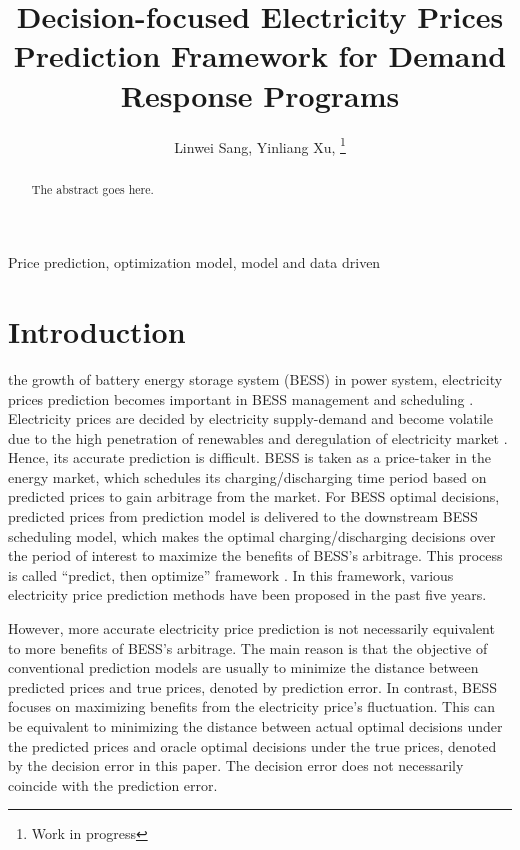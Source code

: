 \documentclass[journal]{IEEEtran}
\begin{document}
\title{Decision-focused Electricity Prices Prediction Framework for Demand Response Programs}

\author{Linwei Sang,
Yinliang Xu,
\thanks{Work in progress}
}

\maketitle

\begin{abstract}
The abstract goes here.
\end{abstract}

\begin{IEEEkeywords}
Price prediction, optimization model, model and data driven
\end{IEEEkeywords}


\IEEEpeerreviewmaketitle


\section{Introduction}

 the growth of battery energy storage system (BESS) in power system, electricity prices prediction becomes important in BESS management and scheduling \cite{Chitsaz2018}. Electricity prices are decided by electricity supply-demand and become volatile due to the high penetration of renewables and deregulation of electricity market \cite{Peng2018}. Hence, its accurate prediction is difficult. BESS is taken as a price-taker in the energy market, which schedules its charging/discharging time period based on predicted prices to gain arbitrage from the market\cite{Arteaga2019}. For BESS optimal decisions, predicted prices from prediction model is delivered to the downstream BESS scheduling model, which makes the optimal charging/discharging decisions over the period of interest to maximize the benefits of BESS's arbitrage. This process is called ``predict, then optimize'' framework \cite{Elmachtoub2020}. In this framework, various electricity price prediction methods have been proposed in the past five years. 

However, more accurate electricity price prediction is not necessarily equivalent to more benefits of BESS's arbitrage. The main reason is that the objective of conventional prediction models are usually to minimize the distance between predicted prices and true prices, denoted by prediction error. In contrast, BESS focuses on maximizing benefits from the electricity price's fluctuation. This can be equivalent to minimizing the distance between actual optimal decisions under the predicted prices and oracle optimal decisions under the true prices, denoted by the decision error in this paper. The decision error does not necessarily coincide with the prediction error. 
\end{document}
